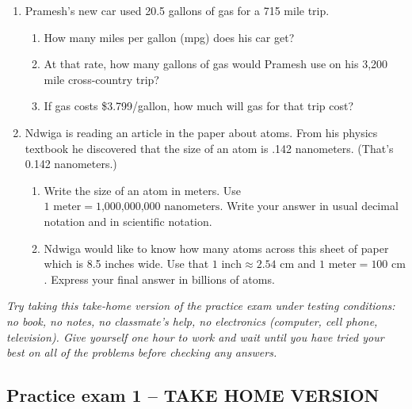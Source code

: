 \documentclass[12pt]{article}
\begin{document}
\begin{enumerate}
\item Pramesh's new car used 20.5 gallons of gas for a 715 mile trip. 
\begin{enumerate}
\item How many miles per gallon (mpg) does his car get? \vfill
\item At that rate, how many gallons of gas would Pramesh use on his 3,200 mile cross-country trip?  \vfill
\item If gas costs \$3.799/gallon, how much will gas for that trip cost?  \vfill
\end{enumerate}

\newpage

\item Ndwiga is reading an article in the paper about atoms.  From his physics textbook he discovered that the size of an atom is .142 nanometers.  (That's 0.142 nanometers.)
\begin{enumerate}
\item Write the size of an atom in meters.  Use $1 \text{ meter} = \text{1,000,000,000 nanometers}$.   Write your answer in usual decimal notation and in scientific notation. \vfill \vfill
\item Ndwiga would like to know how many atoms across this sheet of paper which is 8.5 inches wide. Use that $1 \text{ inch} \approx 2.54 \text{ cm}$ and $1 \text{ meter} = 100 \text{ cm}$.  Express your final answer in billions of atoms. \vfill \vfill \vfill
\end{enumerate}


\end{enumerate}

\newpage %

\emph{Try taking this take-home version of the practice exam under testing conditions:  no book, no notes, no classmate's help, no electronics (computer, cell phone, television). Give yourself one hour to work and wait until you have tried your best on all of the problems before checking any answers.}
\bigskip  %

\subsection*{Practice exam 1 -- TAKE HOME VERSION}
\bigskip
\end{document}
